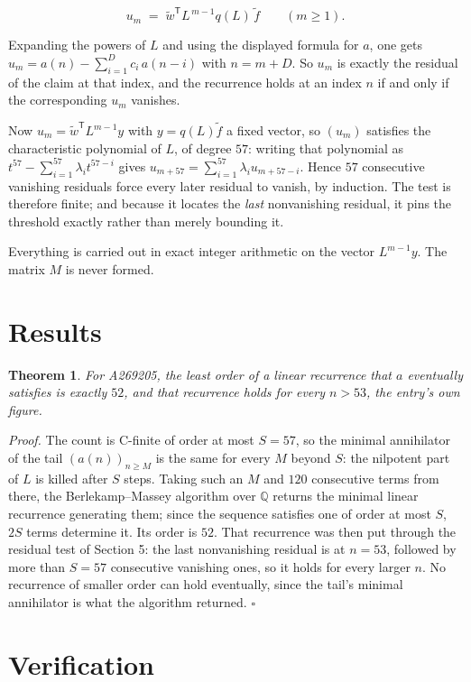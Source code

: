 \documentclass[11pt]{article}
\newtheorem{theorem}{Theorem}
\theoremstyle{definition}
\begin{document}
\[u_m \;=\; \tilde w^{\mathsf T} L^{\,m-1} q(L)\,\tilde f \qquad (m \ge 1).\]

Expanding the powers of $L$ and using the displayed formula for $a$, one gets $u_m = a(n) - \sum_{i=1}^{D} c_i\,a(n-i)$ with $n = m + D$. So $u_m$ is exactly the residual of the claim at that index, and the recurrence holds at an index $n$ if and only if the corresponding $u_m$ vanishes.

Now $u_m = \tilde w^{\mathsf T} L^{m-1} y$ with $y = q(L)\tilde f$ a fixed vector, so $(u_m)$ satisfies the characteristic polynomial of $L$, of degree $57$: writing that polynomial as $t^{57} - \sum_{i=1}^{57} \lambda_i t^{57-i}$ gives $u_{m+57} = \sum_{i=1}^{57} \lambda_i u_{m+57-i}$. Hence $57$ consecutive vanishing residuals force every later residual to vanish, by induction. The test is therefore finite; and because it locates the {\itshape last} nonvanishing residual, it pins the threshold exactly rather than merely bounding it.

Everything is carried out in exact integer arithmetic on the vector $L^{m-1}y$. The matrix $M$ is never formed.

\section{Results}

\begin{theorem} For A269205, the least order of a linear recurrence that $a$ eventually satisfies is exactly $52$, and that recurrence holds for every $n > 53$, the entry's own figure.\end{theorem}

{\itshape Proof.} The count is C-finite of order at most $S = 57$, so the minimal annihilator of the tail $(a(n))_{n \ge M}$ is the same for every $M$ beyond $S$: the nilpotent part of $L$ is killed after $S$ steps. Taking such an $M$ and $120$ consecutive terms from there, the Berlekamp--Massey algorithm over $\mathbb{Q}$ returns the minimal linear recurrence generating them; since the sequence satisfies one of order at most $S$, $2S$ terms determine it. Its order is $52$. That recurrence was then put through the residual test of Section 5: the last nonvanishing residual is at $n = 53$, followed by more than $S = 57$ consecutive vanishing ones, so it holds for every larger $n$. No recurrence of smaller order can hold eventually, since the tail's minimal annihilator is what the algorithm returned. $\square$

\section{Verification}
\end{document}
